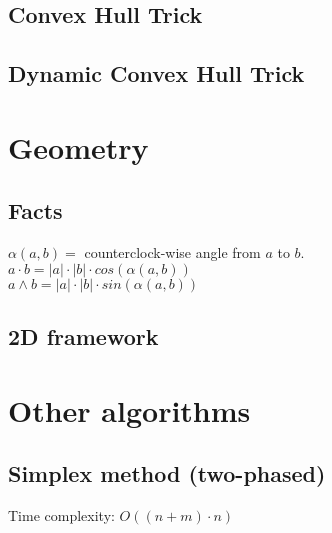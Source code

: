 \documentclass[10pt]{article}
\begin{document}
\subsection{Convex Hull Trick}

\subsection{Dynamic Convex Hull Trick}


\section{Geometry}
\subsection{Facts}
$\alpha(a, b) =$ counterclock-wise angle from $a$ to $b$.\\
$a \cdot b = |a| \cdot |b| \cdot cos(\alpha(a, b))$\\
$a \wedge b = |a| \cdot |b| \cdot sin(\alpha(a, b))$\\
\subsection{2D framework}

\section{Other algorithms}
\subsection{Simplex method (two-phased)}
Time complexity: $O((n + m) \cdot n)$

\end{document}
